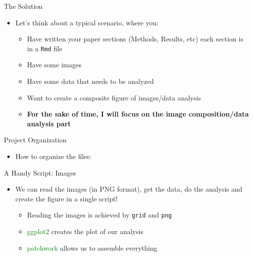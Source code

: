 \documentclass[
  ignorenonframetext,
]{beamer}
\providecommand{\tightlist}{%
  \setlength{\itemsep}{0pt}\setlength{\parskip}{0pt}}\usepackage{longtable,booktabs,array}
\begin{document}
\begin{frame}[fragile]{The Solution}
\protect\hypertarget{the-solution-2}{}
\begin{itemize}[<+->]
\tightlist
\item
  Let's think about a typical scenario, where you:

  \begin{itemize}[<+->]
  \item
    Have written your paper sections (Methods, Results, etc) each
    section is in a \texttt{Rmd} file
  \item
    Have some images
  \item
    Have some data that needs to be analyzed
  \item
    Want to create a composite figure of images/data analysis
  \item
    \textbf{For the sake of time, I will focus on the image
    composition/data analysis part}
  \end{itemize}
\end{itemize}
\end{frame}

\begin{frame}{Project Organization}
\protect\hypertarget{project-organization}{}
\begin{itemize}[<+->]
\tightlist
\item
  How to organize the files:
\end{itemize}

\pause

\end{frame}

\begin{frame}[fragile]{A Handy Script: Images}
\protect\hypertarget{a-handy-script-images}{}
\begin{itemize}[<+->]
\tightlist
\item
  We can read the images (in PNG format), get the data, do the analysis
  and create the figure in a single script!

  \begin{itemize}[<+->]
  \tightlist
  \item
    Reading the images is achieved by \texttt{grid} and \texttt{png}
  \item
    \textcolor{green}{{ggplot2}} creates the plot of our analysis
  \item
    \textcolor{green}{{patchwork}} allows us to assemble everything
  \end{itemize}
\end{itemize}
\end{frame}
\end{document}
